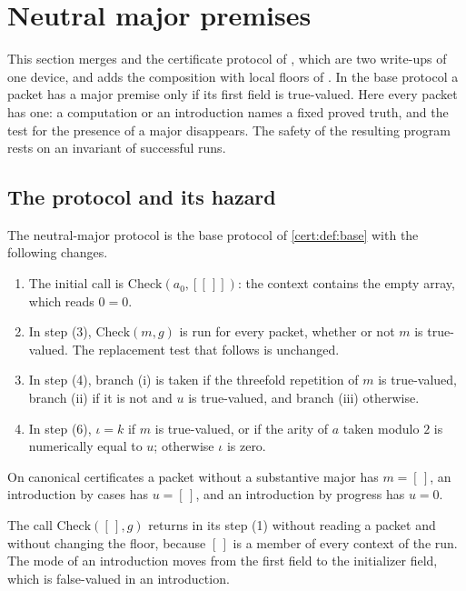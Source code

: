 \section{Neutral major premises}\label{cert:sec:neutral}

This section merges  and the certificate protocol of
, which are two write-ups of one device, and
adds the composition with local floors of . In the base
protocol a packet has a major premise only if its first field is true-valued.
Here every packet has one: a computation or an introduction names a fixed
proved truth, and the test for the presence of a major disappears. The safety
of the resulting program rests on an invariant of successful runs.

\subsection{The protocol and its hazard}

\begin{definition}\label{cert:def:neutral}
The neutral-major protocol is the base protocol of \cref{cert:def:base} with
the following changes.
\begin{enumerate}[label=(N\arabic*)]
\item The initial call is $\mathrm{Check}(a_0,[[\,]])$: the context contains
the empty array, which reads $0=0$.
\item In step (3), $\mathrm{Check}(m,g)$ is run for every packet, whether or
not $m$ is true-valued. The replacement test that follows is unchanged.
\item In step (4), branch (i) is taken if the threefold repetition of $m$ is
true-valued, branch (ii) if it is not and $u$ is true-valued, and branch
(iii) otherwise.
\item In step (6), $\iota=k$ if $m$ is true-valued, or if the arity of $a$
taken modulo $2$ is numerically equal to $u$; otherwise $\iota$ is zero.
\end{enumerate}
On canonical certificates a packet without a substantive major has $m=[\,]$,
an introduction by cases has $u=[\,]$, and an introduction by progress has
$u=0$.
\end{definition}

The call $\mathrm{Check}([\,],g)$ returns in its step (1) without reading a
packet and without changing the floor, because $[\,]$ is a member of every
context of the run. The mode of an introduction moves from the first field to
the initializer field, which is false-valued in an introduction.

